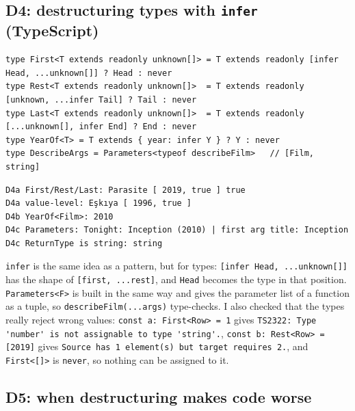 \documentclass[
]{article}
\newcommand{\passthrough}[1]{#1}
\begin{document}
\hypertarget{d4-destructuring-types-with-infer-typescript}{%
\subsection{\texorpdfstring{D4: destructuring types with \texttt{infer}
(TypeScript)}{D4: destructuring types with infer (TypeScript)}}\label{d4-destructuring-types-with-infer-typescript}}

\begin{lstlisting}
type First<T extends readonly unknown[]> = T extends readonly [infer Head, ...unknown[]] ? Head : never
type Rest<T extends readonly unknown[]>  = T extends readonly [unknown, ...infer Tail] ? Tail : never
type Last<T extends readonly unknown[]>  = T extends readonly [...unknown[], infer End] ? End : never
type YearOf<T> = T extends { year: infer Y } ? Y : never
type DescribeArgs = Parameters<typeof describeFilm>   // [Film, string]
\end{lstlisting}

\begin{lstlisting}
D4a First/Rest/Last: Parasite [ 2019, true ] true
D4a value-level: Eşkıya [ 1996, true ]
D4b YearOf<Film>: 2010
D4c Parameters: Tonight: Inception (2010) | first arg title: Inception
D4c ReturnType is string: string
\end{lstlisting}

\passthrough{\lstinline!infer!} is the same idea as a pattern, but for
types: \passthrough{\lstinline![infer Head, ...unknown[]]!} has the
shape of \passthrough{\lstinline![first, ...rest]!}, and
\passthrough{\lstinline!Head!} becomes the type in that position.
\passthrough{\lstinline!Parameters<F>!} is built in the same way and
gives the parameter list of a function as a tuple, so
\passthrough{\lstinline!describeFilm(...args)!} type-checks. I also
checked that the types really reject wrong values:
\passthrough{\lstinline!const a: First<Row> = 1!} gives
\passthrough{\lstinline!TS2322: Type 'number' is not assignable to type 'string'.!},
\passthrough{\lstinline!const b: Rest<Row> = [2019]!} gives
\passthrough{\lstinline!Source has 1 element(s) but target requires 2.!},
and \passthrough{\lstinline!First<[]>!} is
\passthrough{\lstinline!never!}, so nothing can be assigned to it.

\hypertarget{d5-when-destructuring-makes-code-worse}{%
\subsection{D5: when destructuring makes code
worse}\label{d5-when-destructuring-makes-code-worse}}
\end{document}
